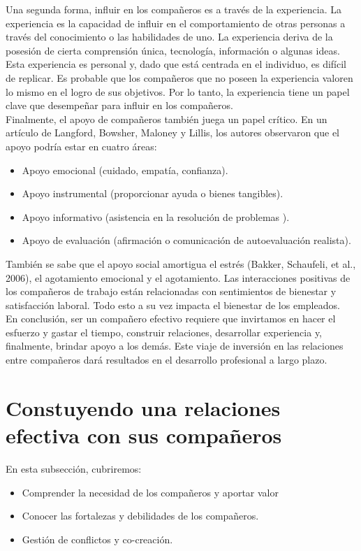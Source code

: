 \documentclass[10pt]{book}
\begin{document}
Una segunda forma, influir en los compañeros es a través de la experiencia. La experiencia es la capacidad de influir en el comportamiento de otras personas a través del conocimiento o las habilidades de uno. La experiencia deriva de la posesión de cierta comprensión única, tecnología, información o algunas ideas. Esta experiencia es personal y, dado que está centrada en el individuo, es difícil de replicar. Es probable que los compañeros que no poseen la experiencia valoren lo mismo en el logro de sus objetivos. Por lo tanto, la experiencia tiene un papel clave que desempeñar para influir en los compañeros.\\
Finalmente, el apoyo de compañeros también juega un papel crítico. En un artículo de Langford, Bowsher, Maloney y Lillis, los autores observaron que el apoyo podría estar en cuatro áreas:
\begin{itemize}
\item Apoyo emocional (cuidado, empatía, confianza).
\item Apoyo instrumental (proporcionar ayuda o bienes tangibles). 
\item Apoyo informativo (asistencia en la resolución de problemas ).
\item Apoyo de evaluación (afirmación o comunicación de autoevaluación realista).
\end{itemize} 
También se sabe que el apoyo social amortigua el estrés (Bakker, Schaufeli, et al., 2006), el agotamiento emocional y el agotamiento. Las interacciones positivas de los compañeros de trabajo están relacionadas con sentimientos de bienestar y satisfacción laboral. Todo esto a su vez impacta el bienestar de los empleados.\\
En conclusión, ser un compañero efectivo requiere que invirtamos en hacer el esfuerzo y gastar el tiempo, construir relaciones, desarrollar experiencia y, finalmente, brindar apoyo a los demás. Este viaje de inversión en las relaciones entre compañeros dará resultados en el desarrollo profesional a largo plazo.
\section{Constuyendo una relaciones efectiva con sus compañeros}
En esta subsección, cubriremos:
\begin{itemize}
\item Comprender la necesidad de los compañeros y aportar valor
\item Conocer las fortalezas y debilidades de los compañeros.
\item Gestión de conflictos y co-creación.
\end{itemize}
\end{document}
